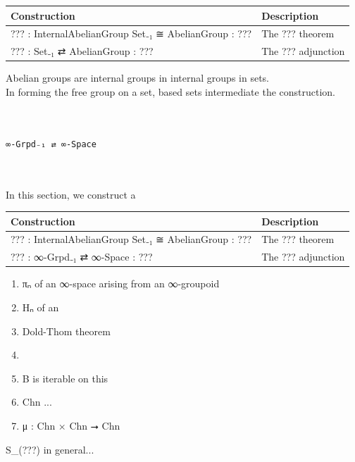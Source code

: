 \documentclass{book}
\theoremstyle{definition}
\renewcommand{\chapter}[1]{
\newpage
{
\Huge 
\begin{center}
\ \\
\ \\
\thispagestyle{empty}
\texttt{#1}
\end{center}}
\ \\
\ \\
}
\begin{document}
{
\footnotesize
\begin{center}
\begin{tabular}{||l | l ||} 
 \hline
 Construction & Description \\
 \hline
??? : InternalAbelianGroup Set₋₁ ≅ AbelianGroup : ???  & The ??? theorem \\
\hline
??? : Set₋₁ ⇄ AbelianGroup : ??? & The ??? adjunction \\
 \hline
\end{tabular}
\end{center}
}

Abelian groups are internal groups in internal groups in sets.\\


In forming the free group on a set, based sets intermediate the construction.\\



\newpage
\chapter{∞-Grpd₋₁ ⇄ ∞-Space}

In this section, we construct a 
{
\footnotesize
\begin{center}
\begin{tabular}{||l | l ||} 
 \hline
 Construction & Description \\
 \hline
 ??? : InternalAbelianGroup Set₋₁ ≅ AbelianGroup : ???  & The ??? theorem \\
\hline
 ??? : ∞-Grpd₋₁ ⇄ ∞-Space : ??? & The ??? adjunction \\
 \hline
\end{tabular}
\end{center}
}


\begin{enumerate}
\item πₙ of an ∞-space arising from an ∞-groupoid
\item Hₙ of an 
\item Dold-Thom theorem
\item 
\item B is iterable on this
\item Chn ... 
\item μ : Chn × Chn ⭢ Chn
\end{enumerate}


S\_(???) in general...

\end{document}
